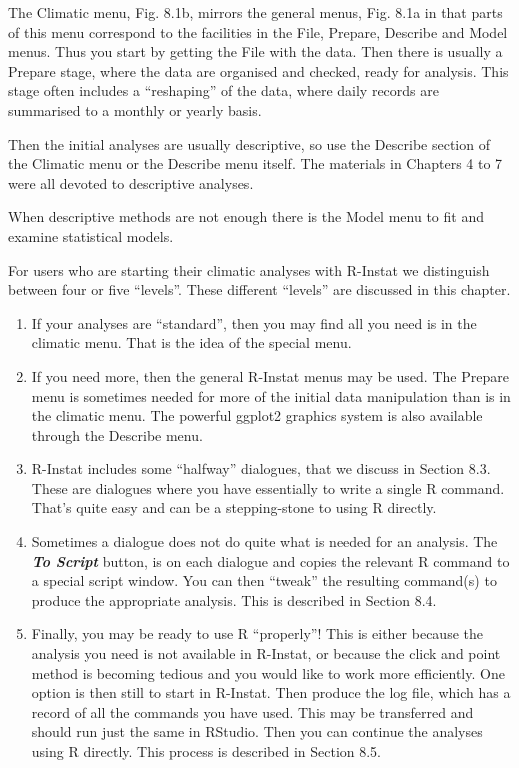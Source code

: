 \documentclass[
  letterpaper,
  DIV=11,
  numbers=noendperiod]{scrreprt}
\begin{document}
The Climatic menu, Fig. 8.1b, mirrors the general menus, Fig. 8.1a in
that parts of this menu correspond to the facilities in the File,
Prepare, Describe and Model menus. Thus you start by getting the File
with the data. Then there is usually a Prepare stage, where the data are
organised and checked, ready for analysis. This stage often includes a
``reshaping'' of the data, where daily records are summarised to a
monthly or yearly basis.

Then the initial analyses are usually descriptive, so use the Describe
section of the Climatic menu or the Describe menu itself. The materials
in Chapters 4 to 7 were all devoted to descriptive analyses.

When descriptive methods are not enough there is the Model menu to fit
and examine statistical models.

For users who are starting their climatic analyses with R-Instat we
distinguish between four or five ``levels''. These different ``levels''
are discussed in this chapter.

\begin{enumerate}
\def\labelenumi{\arabic{enumi}.}
\item
  If your analyses are ``standard'', then you may find all you need is
  in the climatic menu. That is the idea of the special menu.
\item
  If you need more, then the general R-Instat menus may be used. The
  Prepare menu is sometimes needed for more of the initial data
  manipulation than is in the climatic menu. The powerful ggplot2
  graphics system is also available through the Describe menu.
\item
  R-Instat includes some ``halfway'' dialogues, that we discuss in
  Section 8.3. These are dialogues where you have essentially to write a
  single R command. That's quite easy and can be a stepping-stone to
  using R directly.
\item
  Sometimes a dialogue does not do quite what is needed for an analysis.
  The \textbf{\emph{To Script}} button, is on each dialogue and copies
  the relevant R command to a special script window. You can then
  ``tweak'' the resulting command(s) to produce the appropriate
  analysis. This is described in Section 8.4.
\item
  Finally, you may be ready to use R ``properly''! This is either
  because the analysis you need is not available in R-Instat, or because
  the click and point method is becoming tedious and you would like to
  work more efficiently. One option is then still to start in R-Instat.
  Then produce the log file, which has a record of all the commands you
  have used. This may be transferred and should run just the same in
  RStudio. Then you can continue the analyses using R directly. This
  process is described in Section 8.5.
\end{enumerate}
\end{document}
